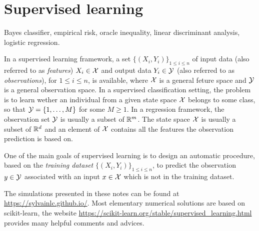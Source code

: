 \chapter{Supervised learning}
\minitoc
\begin{kwd}
Bayes classifier, empirical risk, oracle inequality, linear discriminant analysis, logistic regression.
\end{kwd}


In a supervised learning framework, a set $\{(X_i,Y_i)\}_{1\leqslant i \leqslant n}$  of input data (also referred to as {\em features}) $X_i\in\mathcal{X}$ and output data $Y_i\in\mathcal{Y}$ (also referred to as {\em observations}), for $1\leqslant i \leqslant n$, is available, where $\mathcal{X}$ is a general feture space and $\mathcal{Y}$ is a general observation space. In a supervised classification setting, the problem is to learn wether an individual from a given state space $\mathcal{X}$ belongs to some class, so that $\mathcal{Y} = \{1,\ldots,M\}$ for some $M\geqslant 1$. In a regression framework, the observation set $\mathcal{Y}$ is usually a subset of $\mathbb{R}^m$. The state space $\mathcal{X}$ is usually a subset of $\mathbb{R}^d$ and an element of $\mathcal{X}$ contains all the features the observation prediction is  based on.

One of the main goals of supervised learning is to design an automatic procedure, based on  the {\em training dataset} $\{(X_i,Y_i)\}_{1\leqslant i \leqslant n}$,  to predict the observation $y\in\mathcal{Y}$ associated with an input $x\in\mathcal{X}$ which is not in the training dataset.

\medskip

The simulations presented in these notes can be found at \url{https://sylvainlc.github.io/}. Most elementary numerical solutions are based on scikit-learn, the website \url{https://scikit-learn.org/stable/supervised\_learning.html} provides many helpful comments and advices.


